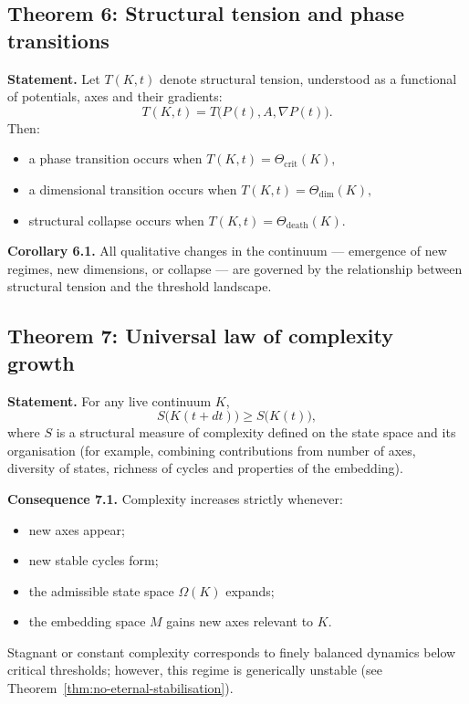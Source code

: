 \subsection{Theorem 6: Structural tension and phase transitions}

\textbf{Statement.}
Let \(T(K,t)\) denote structural tension, understood as a functional of potentials, axes and their gradients:
\[
    T(K,t) = T\big(P(t),A,\nabla P(t)\big).
\]
Then:
\begin{itemize}
    \item a phase transition occurs when
          \(
              T(K,t) = \Theta_{\mathrm{crit}}(K),
          \)
    \item a dimensional transition occurs when
          \(
              T(K,t) = \Theta_{\mathrm{dim}}(K),
          \)
    \item structural collapse occurs when
          \(
              T(K,t) = \Theta_{\mathrm{death}}(K).
          \)
\end{itemize}

\textbf{Corollary 6.1.}
All qualitative changes in the continuum --- emergence of new regimes, new dimensions, or collapse --- are governed by the relationship between structural tension and the threshold landscape.

\subsection{Theorem 7: Universal law of complexity growth}

\textbf{Statement.}
For any live continuum \(K\),
\[
    S\big(K(t+dt)\big) \ge S\big(K(t)\big),
\]
where \(S\) is a structural measure of complexity defined on the state space and its organisation (for example, combining contributions from number of axes, diversity of states, richness of cycles and properties of the embedding).

\textbf{Consequence 7.1.}
Complexity increases strictly whenever:
\begin{itemize}
    \item new axes appear;
    \item new stable cycles form;
    \item the admissible state space \(\Omega(K)\) expands;
    \item the embedding space \(M\) gains new axes relevant to \(K\).
\end{itemize}
Stagnant or constant complexity corresponds to finely balanced dynamics below critical thresholds; however, this regime is generically unstable (see Theorem~\ref{thm:no-eternal-stabilisation}).

